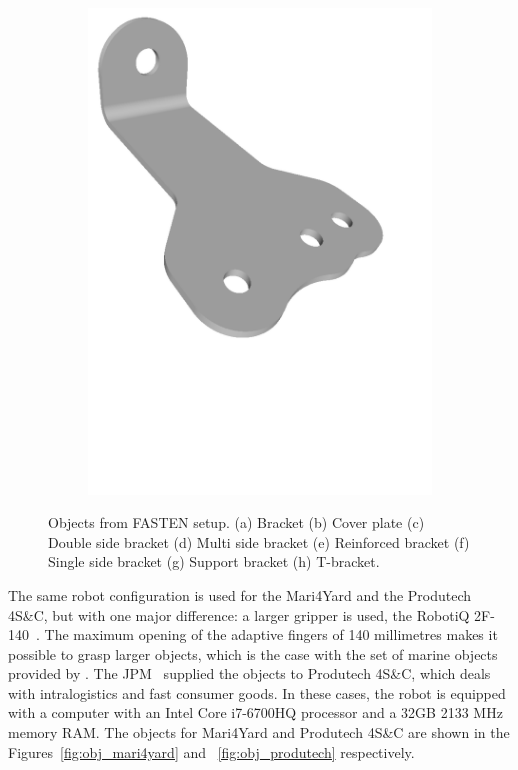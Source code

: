 \begin{figure}[h!]
{\begin{tcolorbox}
\begin{subfigure}[c]{.23\textwidth}
         \includegraphics[trim={0cm 8cm 0cm 0cm},clip,width=1\linewidth,angle=0]{Cap5/Figuras/objects/t_bracket.pdf}
         \caption{}
         \label{fig:t_bracket}
      \end{subfigure}
     \end{tcolorbox}
     \caption{Objects from FASTEN setup. (a) Bracket (b) Cover plate (c) Double side bracket (d) Multi side bracket (e) Reinforced bracket (f) Single side bracket (g) Support bracket (h) T-bracket.}
     \label{fig:obj_fasten}
   }%
 \end{figure}

The same robot configuration is used for the Mari4Yard and the Produtech 4S\&C, but with one major difference: a larger gripper is used, the RobotiQ 2F-140~\cite{robotiq_grippers}. The maximum opening of the adaptive fingers of 140 millimetres makes it possible to grasp larger objects, which is the case with the set of marine objects provided by . The JPM~\cite{jpm} supplied the objects to Produtech 4S\&C, which deals with intralogistics and fast consumer goods. In these cases, the robot is equipped with a computer with an Intel Core i7-6700HQ processor and a 32GB 2133 MHz memory RAM. The objects for Mari4Yard and Produtech 4S\&C are shown in the Figures~\ref{fig:obj_mari4yard} and ~\ref{fig:obj_produtech} respectively.


